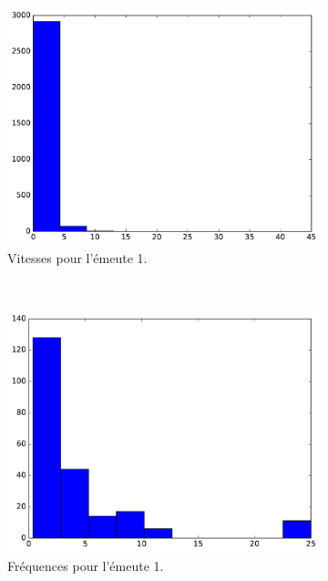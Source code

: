 	\begin{figure}[htb]
		\begin{subfigure}[t]{\subImgWaStats}
			\centering
			\includegraphics[width=\textwidth]{figures/ch3/riot_speed}
			\caption{Vitesses pour l'émeute 1.}
			\label{fig:riot_speed}
		\end{subfigure}
		~
		\begin{subfigure}[t]{\subImgWaStats}
			\centering
			\includegraphics[width=\textwidth]{figures/ch3/riot_frequency}
			\caption{Fréquences pour l'émeute 1.}
			\label{fig:riot_frequency}
		\end{subfigure}
		~
		\begin{subfigure}[t]{\subImgWaStats}

\end{subfigure}
\end{figure}
